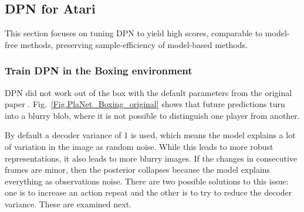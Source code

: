 \subsection{DPN for Atari}

This section focuses on tuning DPN to yield high scores, comparable to model-free methods, preserving sample-efficiency of model-based methods.

\subsubsection{Train DPN in the Boxing environment}

DPN did not work out of the box with the default parameters from the original paper \cite{Algo.PlaNet}. Fig.~\ref{Fig.PlaNet_Boxing_original} shows that future predictions turn into a blurry blob, where it is not possible to distinguish one player from another.

By default a decoder variance of 1 is used, which means the model explains a lot of variation in the image as random noise. While this leads to more robust representations, it also leads to more blurry images. If the changes in consecutive frames are minor, then the posterior collapses because the model explains everything as observations noise. There are two possible solutions to this issue: one is to increase an action repeat and the other is to try to reduce the decoder variance. These are examined next.

